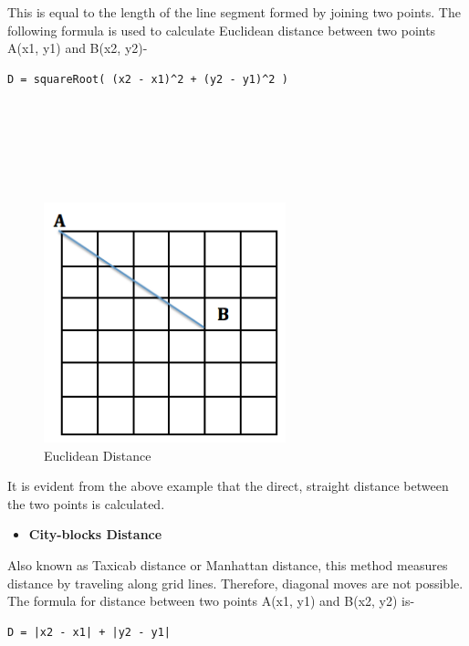 \documentclass[]{article}
\providecommand{\tightlist}{%
  \setlength{\itemsep}{0pt}\setlength{\parskip}{0pt}}
\begin{document}
This is equal to the length of the line segment formed by joining two
points. The following formula is used to calculate Euclidean distance
between two points A(x1, y1) and B(x2, y2)-

\begin{verbatim}
D = squareRoot( (x2 - x1)^2 + (y2 - y1)^2 )
\end{verbatim}
~\\ \\ \\ \\ \\
\begin{figure}[htbp]
\begin{center}
\includegraphics[width = 7cm]{images/Distance Transform/Images/Euclidean Distance.png}
\caption{Euclidean Distance}
\end{center}
\end{figure}

It is evident from the above example that the direct, straight distance
between the two points is calculated.

\begin{itemize}
\tightlist
\item
  \textbf{City-blocks Distance}
\end{itemize}

Also known as Taxicab distance or Manhattan distance, this method
measures distance by traveling along grid lines. Therefore, diagonal
moves are not possible. The formula for distance between two points
A(x1, y1) and B(x2, y2) is-

\begin{verbatim}
D = |x2 - x1| + |y2 - y1|
\end{verbatim}
\end{document}

